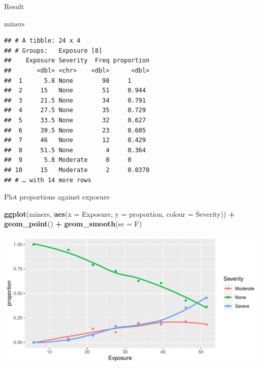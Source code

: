 \documentclass[ignorenonframetext,]{beamer}
\newenvironment{Shaded}{\begin{snugshade}}{\end{snugshade}}
\newcommand{\DataTypeTok}[1]{\textcolor[rgb]{0.13,0.29,0.53}{#1}}
\newcommand{\KeywordTok}[1]{\textcolor[rgb]{0.13,0.29,0.53}{\textbf{#1}}}
\newcommand{\NormalTok}[1]{#1}
\newcommand{\OperatorTok}[1]{\textcolor[rgb]{0.81,0.36,0.00}{\textbf{#1}}}
\newcommand{\StringTok}[1]{\textcolor[rgb]{0.31,0.60,0.02}{#1}}
\begin{document}
\begin{frame}[fragile]{Result}
\protect\hypertarget{result}{}

\small

\begin{Shaded}
\begin{Highlighting}[]
\NormalTok{miners}
\end{Highlighting}
\end{Shaded}

\begin{verbatim}
## # A tibble: 24 x 4
## # Groups:   Exposure [8]
##    Exposure Severity  Freq proportion
##       <dbl> <chr>    <dbl>      <dbl>
##  1      5.8 None        98     1     
##  2     15   None        51     0.944 
##  3     21.5 None        34     0.791 
##  4     27.5 None        35     0.729 
##  5     33.5 None        32     0.627 
##  6     39.5 None        23     0.605 
##  7     46   None        12     0.429 
##  8     51.5 None         4     0.364 
##  9      5.8 Moderate     0     0     
## 10     15   Moderate     2     0.0370
## # … with 14 more rows
\end{verbatim}

\normalsize

\end{frame}

\begin{frame}[fragile]{Plot proportions against exposure}
\protect\hypertarget{plot-proportions-against-exposure}{}

\small

\begin{Shaded}
\begin{Highlighting}[]
\KeywordTok{ggplot}\NormalTok{(miners, }\KeywordTok{aes}\NormalTok{(}\DataTypeTok{x =}\NormalTok{ Exposure, }\DataTypeTok{y =}\NormalTok{ proportion,}
                   \DataTypeTok{colour =}\NormalTok{ Severity)) }\OperatorTok{+}\StringTok{ }
\StringTok{  }\KeywordTok{geom_point}\NormalTok{() }\OperatorTok{+}\StringTok{ }\KeywordTok{geom_smooth}\NormalTok{(}\DataTypeTok{se =}\NormalTok{ F)}
\end{Highlighting}
\end{Shaded}

\includegraphics{figure/unnamed-chunk-108-1.pdf} \normalsize

\end{frame}
\end{document}

